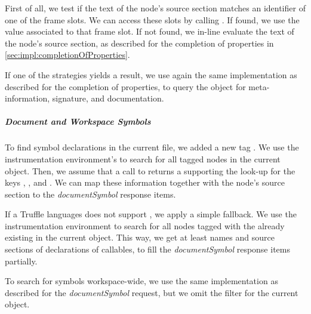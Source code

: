     First of all, we test if the text of the node's source section matches an identifier of one of the frame slots. We can access these slots by calling . If found, we use the value associated to that frame slot. If not found, we in-line evaluate the text of the node's source section, as described for the completion of properties in \autoref{sec:impl:completionOfProperties}.

    If one of the strategies yields a result, we use again the same implementation as described for the completion of properties, to query the object for meta-information, signature, and documentation.


    \subparagraph{Document and Workspace Symbols}

    To find symbol declarations in the current file, we added a new tag . We use the instrumentation environment's  to search for all tagged nodes in the current  object. Then, we assume that a call to  returns a  supporting the look-up for the keys , , and . We can map these information together with the node's source section to the \emph{documentSymbol} response items.

    If a Truffle languages does not support , we apply a simple fallback. We use the instrumentation environment to search for all nodes tagged with the already existing  in the current  object. This way, we get at least names and source sections of declarations of callables, to fill the \emph{documentSymbol} response items partially.

    To search for symbols workspace-wide, we use the same implementation as described for the \emph{documentSymbol} request, but we omit the filter for the current  object.


